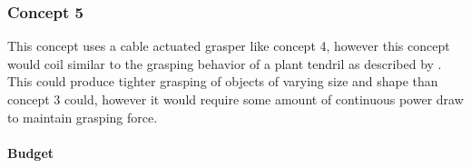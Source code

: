 \subsubsection{Concept 5} 

This concept uses a cable actuated grasper like concept 4, however this concept would coil similar 
to the grasping behavior of a plant tendril as described by \cite{klimm_force_2023}. This could produce
tighter grasping of objects of varying size and shape than concept 3 could, however it would require some amount of
continuous power draw to maintain grasping force.


\paragraph{Budget}

